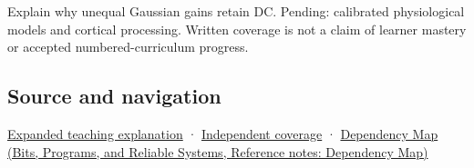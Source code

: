 Explain why unequal Gaussian gains retain DC. Pending: calibrated physiological models and cortical processing. Written coverage is not a claim of learner mastery or accepted numbered-curriculum progress.

\subsection{Source and navigation}\label{appendix-7281c15ac44a-source-and-navigation}

\hyperref[04-visual-computing-ii-ch042-the-eye-is-an-optical-instrument-with-neural-processing-inside-it]{Expanded teaching explanation} · \hyperref[appendix-fd090d982a15-xr01---independent-seeing-and-representation-source]{Independent coverage} · \href{../01-Bits-Programs-and-Reliable-Systems/main.pdf\#nameddest=appendix-4ad47bdd269a}{Dependency Map (Bits, Programs, and Reliable Systems, Reference notes: Dependency Map)}
